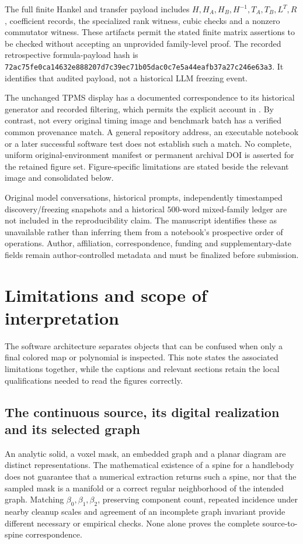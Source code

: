 The full finite Hankel and transfer payload includes $H,H_A,H_B,H^{-1},T_A,T_B,L^T,R$, coefficient records, the specialized rank witness, cubic checks and a nonzero commutator witness. These artifacts permit the stated finite matrix assertions to be checked without accepting an unprovided family-level proof. The recorded retrospective formula-payload hash is \texttt{72ac75fe0ca14632e888207d7c39ec71b05dac0c7e5a44eafb37a27c246e63a3}. It identifies that audited payload, not a historical LLM freezing event.

The unchanged TPMS display has a documented correspondence to its historical generator and recorded filtering, which permits the explicit account in . By contrast, not every original timing image and benchmark batch has a verified common provenance match. A general repository address, an executable notebook or a later successful software test does not establish such a match. No complete, uniform original-environment manifest or permanent archival DOI is asserted for the retained figure set. Figure-specific limitations are stated beside the relevant image and consolidated below.

Original model conversations, historical prompts, independently timestamped discovery/freezing snapshots and a historical $500$-word mixed-family ledger are not included in the reproducibility claim. The manuscript identifies these as unavailable rather than inferring them from a notebook's prospective order of operations. Author, affiliation, correspondence, funding and supplementary-date fields remain author-controlled metadata and must be finalized before submission.

\FloatBarrier
\section{Limitations and scope of interpretation}
\label{supp:limitations}
The software architecture separates objects that can be confused when only a final colored map or polynomial is inspected. This note states the associated limitations together, while the captions and relevant sections retain the local qualifications needed to read the figures correctly.

\subsection{The continuous source, its digital realization and its selected graph}
\label{supp:limitations_correspondence}
An analytic solid, a voxel mask, an embedded graph and a planar diagram are distinct representations. The mathematical existence of a spine for a handlebody does not guarantee that a numerical extraction returns such a spine, nor that the sampled mask is a manifold or a correct regular neighborhood of the intended graph. Matching $\beta_0,\beta_1,\beta_2$, preserving component count, repeated incidence under nearby cleanup scales and agreement of an incomplete graph invariant provide different necessary or empirical checks. None alone proves the complete source-to-spine correspondence.

